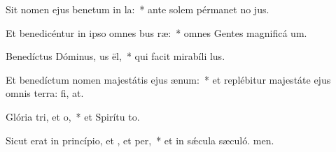 \item Sit nomen ejus benetum in la:~* ante solem pérmanet no jus.
\item Et benedicéntur in ipso omnes bus ræ:~* omnes Gentes magnificá um.
\item Benedíctus Dóminus, us ël,~* qui facit mirabíli lus.
\item Et benedíctum nomen majestátis ejus  ænum:~* et replébitur majestáte ejus omnis terra: fi, at.
\item Glória tri, et o,~* et Spirítu to.
\item Sicut erat in princípio, et , et per,~* et in sǽcula sæculó. men.
